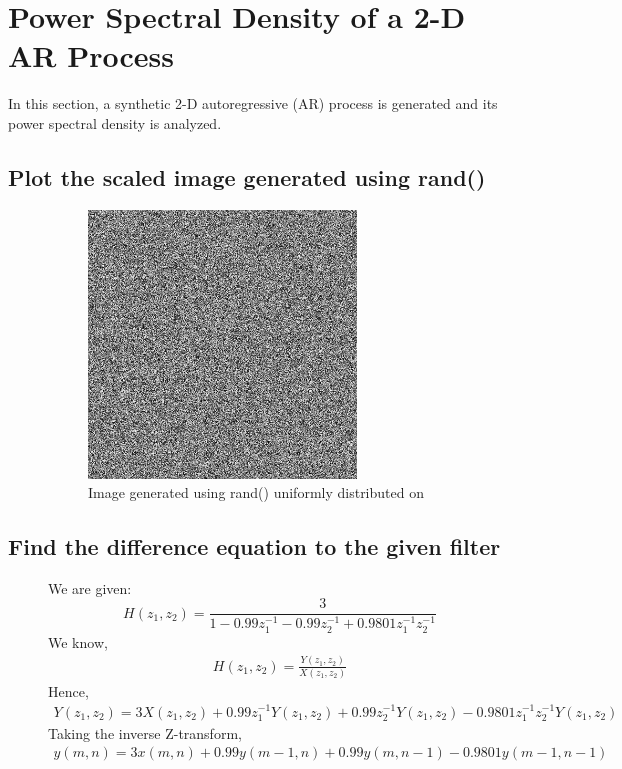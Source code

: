 \documentclass{article}
\begin{document}
\section{Power Spectral Density of a 2-D AR Process}
	In this section, a synthetic 2-D autoregressive (AR) process is generated and its
	power spectral density is analyzed.

\subsection{Plot the scaled image generated using rand()}
	\begin{description}
	\item[]
		\begin{figure}[h]
			\begin{center}
				\includegraphics[width=0.7\textwidth]{randimg.png}
				\caption{Image generated using rand() uniformly distributed on \string[-0.5,0.5]}
			\end{center}
		\end{figure}
	\end{description}

\subsection{Find the difference equation to the given filter}
	\begin{description}
	\item[]
		We are given:
		\begin{equation}
			H(z_1,z_2) = \frac{3}{1-0.99z_1^{-1}-0.99z_2^{-1}+0.9801z_1^{-1}z_2^{-1}}
		\end{equation}
		We know,
		\begin{align*}
			H(z_1,z_2) = \frac{Y(z_1,z_2)}{X(z_1,z_2)}
		\end{align*}
		Hence,
		\begin{align*}
			Y(z_1,z_2) = 3X(z_1,z_2)+0.99z_1^{-1}Y(z_1,z_2)+0.99z_2^{-1}Y(z_1,z_2)-0.9801z_1^{-1}z_2^{-1}Y(z_1,z_2)
		\end{align*}
		Taking the inverse Z-transform,
		\begin{align*}
			y(m,n) = 3x(m,n)+0.99y(m-1,n)+0.99y(m,n-1)-0.9801y(m-1,n-1)
		\end{align*}
	\end{description}
\end{document}
